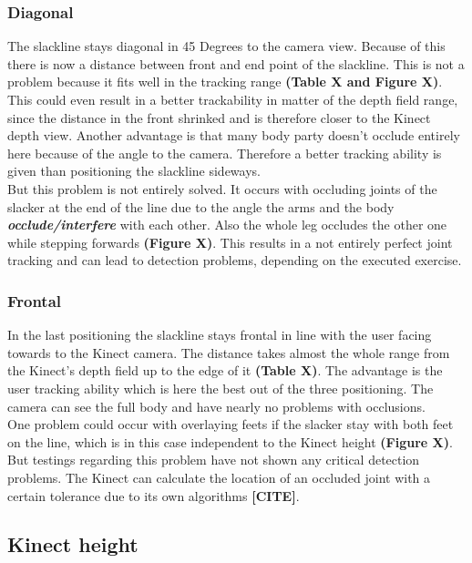 \subsubsection{Diagonal}
The slackline stays diagonal in 45 Degrees to the camera view. Because of this there is now a distance between front and end point of the slackline. This is not a problem because it fits well in the tracking range \textbf{(Table X and Figure X)}. This could even result in a better trackability in matter of the depth field range, since the distance in the front shrinked and is therefore closer to the Kinect depth view. Another advantage is that many body party doesn't occlude entirely here because of the angle to the camera. Therefore a better tracking ability is given than positioning the slackline sideways.
\\
But this problem is not entirely solved. It occurs with occluding joints of the slacker at the end of the line due to the angle the arms and the body \textbf{\textit{occlude/interfere}} with each other. Also the whole leg occludes the other one while stepping forwards \textbf{(Figure X)}. This results in a not entirely perfect joint tracking and can lead to detection problems, depending on the executed exercise.

\subsubsection{Frontal}
In the last positioning the slackline stays frontal in line with the user facing towards to the Kinect camera. The distance takes almost the whole range from the Kinect’s depth field up to the edge of it \textbf{(Table X)}. The advantage is the user tracking ability which is here the best out of the three positioning. The camera can see the full body and have nearly no problems with occlusions.\\
One problem could occur with overlaying feets if the slacker stay with both feet on the line, which is in this case independent to the Kinect height \textbf{(Figure X)}. But testings regarding this problem have not shown any critical detection problems. The Kinect can calculate the location of an occluded joint with a certain tolerance due to its own algorithms \textbf{[CITE]}.

\subsection{Kinect height}

